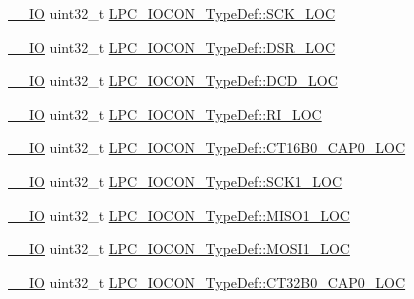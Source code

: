 \begin{DoxyCompactItemize}
\item 
\hyperlink{group___c_m_s_i_s__core__definitions_gaec43007d9998a0a0e01faede4133d6be}{\+\_\+\+\_\+\+IO} uint32\+\_\+t \hyperlink{group___l_p_c11xx___definitions_gabee829d0788636cad1cefdfdb9d29fee}{L\+P\+C\+\_\+\+I\+O\+C\+O\+N\+\_\+\+Type\+Def\+::\+S\+C\+K\+\_\+\+L\+OC}
\item 
\hyperlink{group___c_m_s_i_s__core__definitions_gaec43007d9998a0a0e01faede4133d6be}{\+\_\+\+\_\+\+IO} uint32\+\_\+t \hyperlink{group___l_p_c11xx___definitions_ga8c4a13589d65569c8a92ad3bfdb74ad6}{L\+P\+C\+\_\+\+I\+O\+C\+O\+N\+\_\+\+Type\+Def\+::\+D\+S\+R\+\_\+\+L\+OC}
\item 
\hyperlink{group___c_m_s_i_s__core__definitions_gaec43007d9998a0a0e01faede4133d6be}{\+\_\+\+\_\+\+IO} uint32\+\_\+t \hyperlink{group___l_p_c11xx___definitions_gae619bf8f2c109b169f653a8689656350}{L\+P\+C\+\_\+\+I\+O\+C\+O\+N\+\_\+\+Type\+Def\+::\+D\+C\+D\+\_\+\+L\+OC}
\item 
\hyperlink{group___c_m_s_i_s__core__definitions_gaec43007d9998a0a0e01faede4133d6be}{\+\_\+\+\_\+\+IO} uint32\+\_\+t \hyperlink{group___l_p_c11xx___definitions_gac464399c1e24e3c34085b91429d0cebc}{L\+P\+C\+\_\+\+I\+O\+C\+O\+N\+\_\+\+Type\+Def\+::\+R\+I\+\_\+\+L\+OC}
\item 
\hyperlink{group___c_m_s_i_s__core__definitions_gaec43007d9998a0a0e01faede4133d6be}{\+\_\+\+\_\+\+IO} uint32\+\_\+t \hyperlink{group___l_p_c11xx___definitions_ga665596a8d6cc6bd6f61485aba90d62c5}{L\+P\+C\+\_\+\+I\+O\+C\+O\+N\+\_\+\+Type\+Def\+::\+C\+T16\+B0\+\_\+\+C\+A\+P0\+\_\+\+L\+OC}
\item 
\hyperlink{group___c_m_s_i_s__core__definitions_gaec43007d9998a0a0e01faede4133d6be}{\+\_\+\+\_\+\+IO} uint32\+\_\+t \hyperlink{group___l_p_c11xx___definitions_gad6627c21723c298dedcef119bff3ca6e}{L\+P\+C\+\_\+\+I\+O\+C\+O\+N\+\_\+\+Type\+Def\+::\+S\+C\+K1\+\_\+\+L\+OC}
\item 
\hyperlink{group___c_m_s_i_s__core__definitions_gaec43007d9998a0a0e01faede4133d6be}{\+\_\+\+\_\+\+IO} uint32\+\_\+t \hyperlink{group___l_p_c11xx___definitions_ga3aed5efce144c7f27500230e8cbbbf2f}{L\+P\+C\+\_\+\+I\+O\+C\+O\+N\+\_\+\+Type\+Def\+::\+M\+I\+S\+O1\+\_\+\+L\+OC}
\item 
\hyperlink{group___c_m_s_i_s__core__definitions_gaec43007d9998a0a0e01faede4133d6be}{\+\_\+\+\_\+\+IO} uint32\+\_\+t \hyperlink{group___l_p_c11xx___definitions_ga50678fa63c5721d9e4622405102531be}{L\+P\+C\+\_\+\+I\+O\+C\+O\+N\+\_\+\+Type\+Def\+::\+M\+O\+S\+I1\+\_\+\+L\+OC}
\item 
\hyperlink{group___c_m_s_i_s__core__definitions_gaec43007d9998a0a0e01faede4133d6be}{\+\_\+\+\_\+\+IO} uint32\+\_\+t \hyperlink{group___l_p_c11xx___definitions_gaaeedcd139dfd63880543f3498602fe58}{L\+P\+C\+\_\+\+I\+O\+C\+O\+N\+\_\+\+Type\+Def\+::\+C\+T32\+B0\+\_\+\+C\+A\+P0\+\_\+\+L\+OC}

\end{DoxyCompactItemize}
